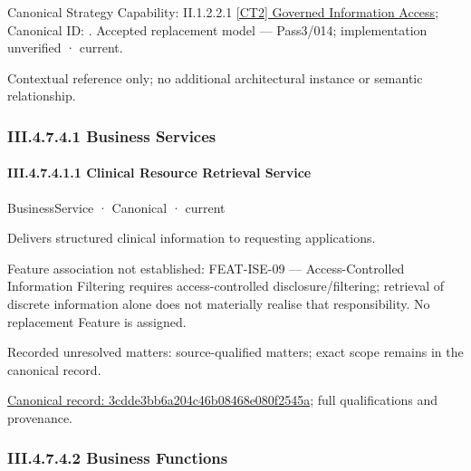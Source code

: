 {\small Canonical Strategy Capability: II.1.2.2.1 \hyperref[element:43146a505617462f96c38459b465bcf1]{[CT2] Governed Information Access}; Canonical ID: \texttt{}. Accepted replacement model — Pass3/014; implementation unverified · current.}\par
Contextual reference only; no additional architectural instance or semantic relationship.\par
\subsubsection*{III.4.7.4.1 Business Services}
\label{navigation:III.4.7.4.1}

\paragraph*{III.4.7.4.1.1 Clinical Resource Retrieval Service}
\label{navigation:III.4.7.4.1.1}

\label{element:3cdde3bb6a204c46b08468e080f2545a}
{\small BusinessService · Canonical · current}\par

Delivers structured clinical information to requesting applications.



Feature association not established: FEAT-ISE-09 — Access-Controlled Information Filtering requires access-controlled disclosure/filtering; retrieval of discrete information alone does not materially realise that responsibility. No replacement Feature is assigned.


{\small Recorded unresolved matters: source-qualified matters; exact scope remains in the canonical record.}\par
{\footnotesize \href{../../../../../../../../continuum/business/business-service/3cdde3bb6a204c46b08468e080f2545a.md}{Canonical record: 3cdde3bb6a204c46b08468e080f2545a}; full qualifications and provenance.}\par
\subsubsection*{III.4.7.4.2 Business Functions}
\label{navigation:III.4.7.4.2}

